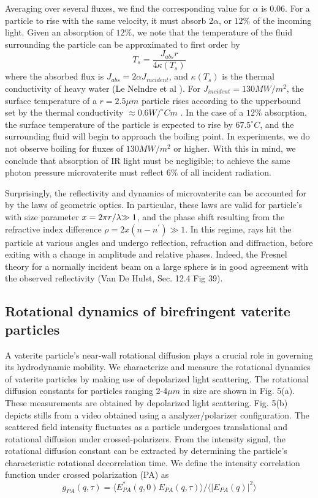 \documentclass[12pt]{article}
\begin{document}
{Averaging over several fluxes, we find the corresponding value for $\alpha$ is 0.06. For a particle to rise with the same velocity, it must  absorb  $2\alpha$, or $12\%$ of the incoming light.  Given an absorption of $12\%$, we note that the temperature of the fluid surrounding
the particle can be approximated to first order by 
\[
T_{s}=\frac{J_{abs}r}{4\kappa(T_{s})}
\]
 where the absorbed flux is $J_{abs}=2\alpha J_{incident}$, and $\kappa(T_{s})$
is the thermal conductivity of heavy water (Le Nelndre et al ). For
$J_{incident}=130 MW/m^{2}$, the surface temperature of a $r=2.5\mu m$
particle rises according to the upperbound set by the thermal conductivity $\approx 0.6\text{}W/^{\circ}Cm$ . In the case of a $12\%$ absorption,
the surface temperature of the particle is expected to rise by $67.5^{\circ}C$,
and the surrounding fluid will begin to approach the boiling point.
In experiments, we do not observe boiling for fluxes of $130MW/m^{2}$
or higher. With this in mind, we conclude that absorption
of IR light must be negligible; to achieve the same photon pressure
microvaterite must reflect $6\%$ of all incident radiation. 

Surprisingly, the reflectivity and dynamics of microvaterite can be accounted for by the laws of geometric optics. In particular, these laws are valid for particle's with size parameter $x=\text{2\ensuremath{\pi r/\lambda}\ensuremath{\gg1}}$, and the phase shift resulting from the refractive index difference
$\rho=2x(n-n^{\prime})\gg1$. In this regime, rays hit the particle
at various angles and undergo reflection, refraction and diffraction,
before exiting with a change in amplitude and relative phases. Indeed,
the Fresnel theory for a normally incident beam on a large sphere
is in good agreement with the observed reflectivity (Van De Hulst,
Sec. 12.4 Fig 39). 
\subsection*{Rotational dynamics of birefringent vaterite particles}

A vaterite particle's near-wall rotational diffusion plays a crucial role in governing its hydrodynamic mobility. We characterize and measure the rotational dynamics of vaterite particles by making use of depolarized light scattering. The rotational diffusion constants for particles ranging  2-4$\mu m$ in size are shown in Fig. 5(a). These measurements are obtained by depolarized light scattering. Fig. 5(b) depicts stills from a video obtained using a  analyzer/polarizer configuration. The scattered field intensity fluctuates as a particle undergoes translational and rotational diffusion under crossed-polarizers. From the intensity signal, the rotational diffusion constant can be extracted by determining the particle's characteristic rotational decorrelation time. We define the intensity correlation function under crossed polarization (PA) as
\begin{equation}
g_{PA}(q,\tau)=\langle E_{PA}^{*}(q,0)E_{PA}(q,\tau)\rangle/\langle|E_{PA}(q)|^{2}\rangle
\end{equation}

}
\end{document}
